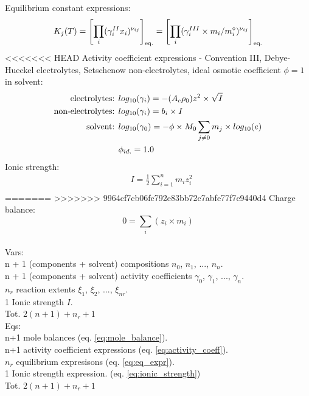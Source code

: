 \documentclass[onecolumn]{article}
\begin{document}
Equilibrium constant expressions:
\begin{equation}
\label{eq:eq_expr}
K_j(T) = \left[ \prod_i(\gamma^{II}_i x_i)^{\nu_{ij}} \right]_{\textnormal{eq.}} =
\left[ \prod_i(\gamma^{III}_i \times m_i/m^{\circ}_i )^{\nu_{ij}} \right]_{\textnormal{eq.}}
\end{equation}
<<<<<<< HEAD
Activity coefficient expressions - Convention III, Debye-Hueckel electrolytes,
Setschenow non-electrolytes, ideal osmotic coefficient $\phi=1$ in solvent:
\begin{equation}
\label{eq:activity_coeff}
\begin{aligned}
\textnormal{electrolytes: } & log_{10}(\gamma_{i}) = -(A_c \rho_0) z^2  \times \sqrt{I} \\
\textnormal{non-electrolytes: } & log_{10}(\gamma_{i}) = b_i \times I \\
\textnormal{solvent: } & log_{10}(\gamma_{0}) =
-\phi \times M_0 \sum_{j\neq0}{m_j} \times log_{10}(e)\\
 & \phi_{id.} =   1.0 \\
\end{aligned}
\end{equation}
Ionic strength:
\begin{equation}
\label{eq:ionic_strength}
\begin{aligned}
& I = \frac{1}{2} \sum_{i=1}^n m_i z_i^2 \\
\end{aligned}
\end{equation}
=======
>>>>>>> 9964cf7cb06fc792e83bb72c7abfe77f7c9440d4
Charge balance:
\begin{equation}
0 = \sum_i(z_i \times m_i)
\end{equation}
\\
Vars: \\
n + 1 (components + solvent) compositions $n_0$, $n_1$, ..., $n_n$. \\
n + 1 (components + solvent) activity coefficients
$\gamma_0$, $\gamma_1$, ..., $\gamma_n$. \\
$n_r$ reaction extents $\xi_1$, $\xi_2$, ..., $\xi_{nr}$. \\
1 Ionic strength $I$. \\
Tot. $2(n + 1) + n_r + 1$ \\
Eqs: \\
n+1 mole balances (eq. \ref{eq:mole_balance}). \\
n+1 activity coefficient expressions (eq. \ref{eq:activity_coeff}). \\
$n_r$ equilibrium expresisons (eq. \ref{eq:eq_expr}). \\
1 Ionic strength expression. (eq. \ref{eq:ionic_strength})\\
Tot. $2(n + 1) + n_r + 1$
\end{document}
